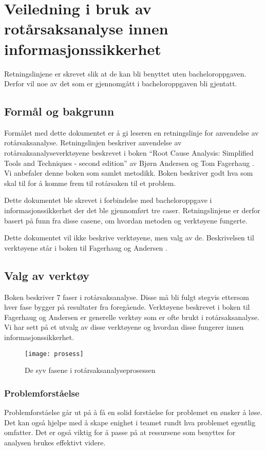 \chapter{Veiledning i bruk av rotårsaksanalyse innen informasjonssikkerhet}
\label{kap:retningslinjer-RCA}
Retningslinjene er skrevet slik at de kan bli benyttet uten bacheloroppgaven. Derfor vil noe av det som er gjennomgått i bacheloroppgaven bli gjentatt.

\section{Formål og bakgrunn}
Formålet med dette dokumentet er å gi leseren en retningslinje for anvendelse av rotårsaksanalyse. Retningslinjen beskriver anvendelse av rotårsaksanalyseverktøyene beskrevet i boken ``Root Cause Analysis: Simplified Tools and Techniques - second edition'' av Bjørn Andersen og Tom Fagerhaug \cite{RCA}. Vi anbefaler denne boken som samlet metodikk. Boken beskriver godt hva som skal til for å komme frem til rotårsaken til et problem. 

Dette dokumentet ble skrevet i forbindelse med bacheloroppgave i informasjonssikkerhet der det ble gjennomført tre caser. Retningslinjene er derfor basert på funn fra disse casene, om hvordan metoden og verktøyene fungerte.

Dette dokumentet vil ikke beskrive verktøyene, men valg av de. Beskrivelsen til verktøyene står i boken til Fagerhaug og Andersen \cite{RCA}.

\section{Valg av verktøy}
Boken beskriver 7 faser i rotårsaksanalyse. Disse må bli fulgt stegvis ettersom hver fase bygger på resultater fra foregående. Verktøyene beskrevet i boken til Fagerhaug og Andersen \cite{RCA} er generelle verktøy som er ofte brukt i rotårsaksanalyse. Vi har sett på et utvalg av disse verktøyene og hvordan disse fungerer innen informasjonssikkerhet. 

\begin{figure}[H]
    \centering
    \texttt{[image: prosess]}
    \caption[RCA-prosess]{De syv fasene i rotårsaksanalyseprosessen}
    \label{fig:prosess_retningslinjer}
\end{figure}
\subsection{Problemforståelse}
Problemforståelse går ut på å få en solid forståelse for problemet en ønsker å løse. Det kan også hjelpe med å skape enighet i teamet rundt hva problemet egentlig omfatter. Det er også viktig for å passe på at ressursene som benyttes for analysen brukes effektivt videre. 

